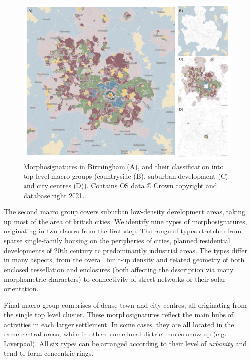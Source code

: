 \begin{figure}
    \includegraphics[width=0.75\linewidth, center]{fig/bham.png}
    \caption{Morphosignatures in Birmingham (A), and their classification
    into top-level macro groups (countryside (B), suburban development (C) and city
    centres (D)). Contains OS data © Crown copyright and database right 2021. }
    \label{fig:bham}
\end{figure}

The second macro group covers suburban low-density development areas, taking up most of the
area of british cities. We identify nine types of morphosignatures, originating in two
classes from the first step. The range of types stretches from sparse single-family
housing on the peripheries of cities, planned residential developments of 20th century
to predominantly industrial areas. The types differ in many aspects, from the overall
built-up density and related geometry of both enclosed tessellation and enclosures (both
affecting the description via many morphometric characters) to connectivity of street
networks or their solar orientation.


Final macro group comprises of dense town and city centres, all originating from the
single top level cluster. These morphosignatures reflect the main hubs of activities in each
larger settlement. In some cases, they are all located in the same central areas, while
in others some local district nodes show up (e.g. Liverpool). All six types can be
arranged according to their level of \textit{urbanity} and tend to form concentric
rings.



